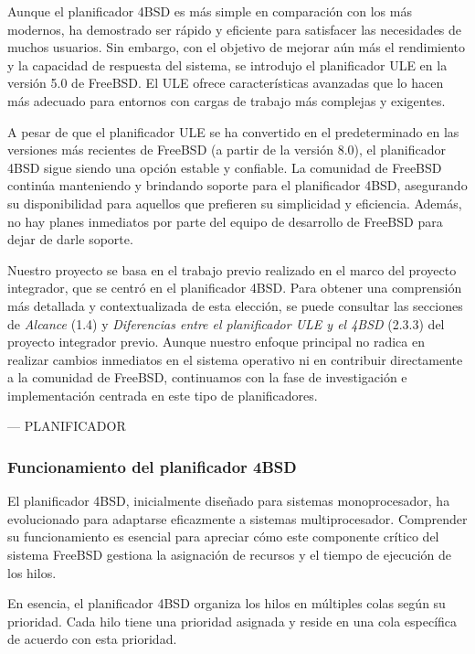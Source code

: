 Aunque el planificador 4BSD es más simple en comparación con los más modernos, ha demostrado ser rápido y eficiente para satisfacer las necesidades de muchos usuarios. Sin embargo, con el objetivo de mejorar aún más el rendimiento y la capacidad de respuesta del sistema, se introdujo el planificador ULE en la versión 5.0 de FreeBSD. El ULE ofrece características avanzadas que lo hacen más adecuado para entornos con cargas de trabajo más complejas y exigentes.\par

A pesar de que el planificador ULE se ha convertido en el predeterminado en las versiones más recientes de FreeBSD (a partir de la versión 8.0), el planificador 4BSD sigue siendo una opción estable y confiable. La comunidad de FreeBSD continúa manteniendo y brindando soporte para el planificador 4BSD, asegurando su disponibilidad para aquellos que prefieren su simplicidad y eficiencia. Además, no hay planes inmediatos por parte del equipo de desarrollo de FreeBSD para dejar de darle soporte.\par

Nuestro proyecto se basa en el trabajo previo realizado en el marco del proyecto integrador, que se centró en el planificador 4BSD. Para obtener una comprensión más detallada y contextualizada de esta elección, se puede consultar las secciones de \textit{Alcance} (1.4) y  \textit{Diferencias entre el planificador ULE y el 4BSD} (2.3.3) del proyecto integrador previo\cite{bib1}. Aunque nuestro enfoque principal no radica en realizar cambios inmediatos en el sistema operativo ni en contribuir directamente a la comunidad de FreeBSD, continuamos con la fase de investigación e implementación centrada en este tipo de planificadores.\par


--- PLANIFICADOR

\subsubsection{Funcionamiento del planificador 4BSD}

El planificador 4BSD, inicialmente diseñado para sistemas monoprocesador, ha evolucionado para adaptarse eficazmente a sistemas multiprocesador. Comprender su funcionamiento es esencial para apreciar cómo este componente crítico del sistema FreeBSD gestiona la asignación de recursos y el tiempo de ejecución de los hilos.\par

En esencia, el planificador 4BSD organiza los hilos en múltiples colas según su prioridad. Cada hilo tiene una prioridad asignada y reside en una cola específica de acuerdo con esta prioridad.\par

